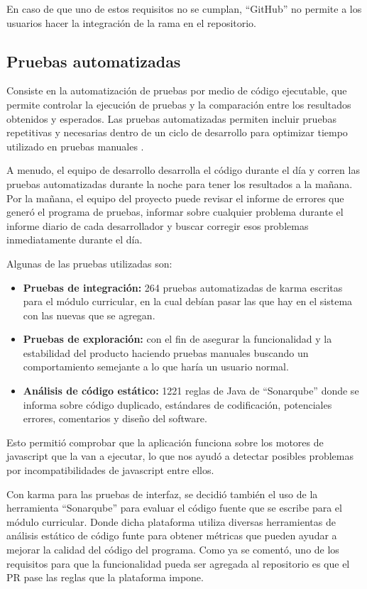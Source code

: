 En caso de que uno de estos requisitos no se cumplan, \enquote{GitHub} no permite a los usuarios hacer la integración de la rama en el repositorio.

\subsection{Pruebas automatizadas}
Consiste en la automatización de pruebas por medio de código ejecutable, que permite controlar la ejecución de pruebas y la comparación entre los resultados obtenidos y esperados. Las pruebas automatizadas permiten incluir pruebas repetitivas y necesarias dentro de un ciclo de desarrollo para optimizar tiempo utilizado en pruebas manuales \citep{crispin2009agile}.

A menudo, el equipo de desarrollo desarrolla el código durante el día y corren las pruebas automatizadas durante la noche para tener los resultados a la mañana. Por la mañana, el equipo del proyecto puede revisar el informe de errores que generó el programa de pruebas, informar sobre cualquier problema durante el informe diario de cada desarrollador y buscar corregir esos problemas inmediatamente durante el día.

Algunas de las pruebas utilizadas son:
\begin{itemize}
	\item \textbf{Pruebas de integración:} 264 pruebas automatizadas de karma escritas para el módulo curricular, en la cual debían pasar las que hay en el sistema con las nuevas que se agregan.
	\item \textbf{Pruebas de exploración:} con el fin de asegurar la funcionalidad y la estabilidad del producto haciendo pruebas manuales buscando un comportamiento semejante a lo que haría un usuario normal.
	\item \textbf{Análisis de código estático:} 1221 reglas de Java de \enquote{Sonarqube} donde se informa sobre código duplicado, estándares de codificación, potenciales errores, comentarios y diseño del software.
\end{itemize}

Esto permitió comprobar que la aplicación funciona sobre los motores de javascript que la van a ejecutar, lo que nos ayudó a detectar posibles problemas por incompatibilidades de javascript entre ellos.

Con karma para las pruebas de interfaz, se decidió también el uso de la herramienta \enquote{Sonarqube} para evaluar el código fuente que se escribe para el módulo curricular. Donde dicha plataforma utiliza diversas herramientas de análisis estático de código funte para obtener métricas que pueden ayudar a mejorar la calidad del código del programa. Como ya se comentó, uno de los requisitos para que la funcionalidad pueda ser agregada al repositorio es que el PR pase las reglas que la plataforma impone.

